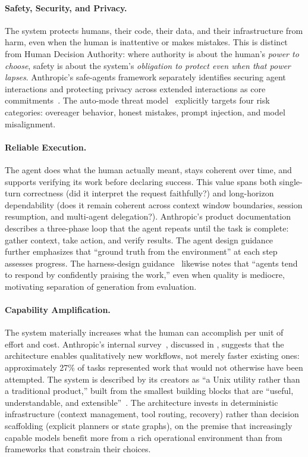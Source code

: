 \paragraph{Safety, Security, and Privacy.}
The system protects humans, their code, their data, and their infrastructure from harm, even when the human is inattentive or makes mistakes. This is distinct from Human Decision Authority: where authority is about the human's \emph{power to choose}, safety is about the system's \emph{obligation to protect even when that power lapses}. Anthropic's safe-agents framework separately identifies securing agent interactions and protecting privacy across extended interactions as core commitments~\citep{anthropic2025agents}. The auto-mode threat model~\citep{anthropic2026automode} explicitly targets four risk categories: overeager behavior, honest mistakes, prompt injection, and model misalignment.

\paragraph{Reliable Execution.}
The agent does what the human actually meant, stays coherent over time, and supports verifying its work before declaring success. This value spans both single-turn correctness (did it interpret the request faithfully?) and long-horizon dependability (does it remain coherent across context window boundaries, session resumption, and multi-agent delegation?). Anthropic's product documentation~\citep{anthropic2026howworks} describes a three-phase loop that the agent repeats until the task is complete: gather context, take action, and verify results. The agent design guidance~\citep{anthropic2024effective} further emphasizes that ``ground truth from the environment'' at each step assesses progress. The harness-design guidance~\citep{anthropic2026harness} likewise notes that ``agents tend to respond by confidently praising the work,'' even when quality is mediocre, motivating separation of generation from evaluation.

\paragraph{Capability Amplification.}
The system materially increases what the human can accomplish per unit of effort and cost. Anthropic's internal survey~\citep{anthropic2025internal}, discussed in
, suggests that the architecture enables qualitatively new
workflows, not merely faster existing ones: approximately 27\% of tasks
represented work that would not otherwise have been attempted. The system is described by its creators as ``a Unix utility rather than a traditional product,'' built from the smallest building blocks that are ``useful, understandable, and extensible''~\citep{cherny2025latentspace}. The architecture invests in deterministic infrastructure (context management, tool routing, recovery) rather than decision scaffolding (explicit planners or state graphs), on the premise that increasingly capable models benefit more from a rich operational environment than from frameworks that constrain their choices.


